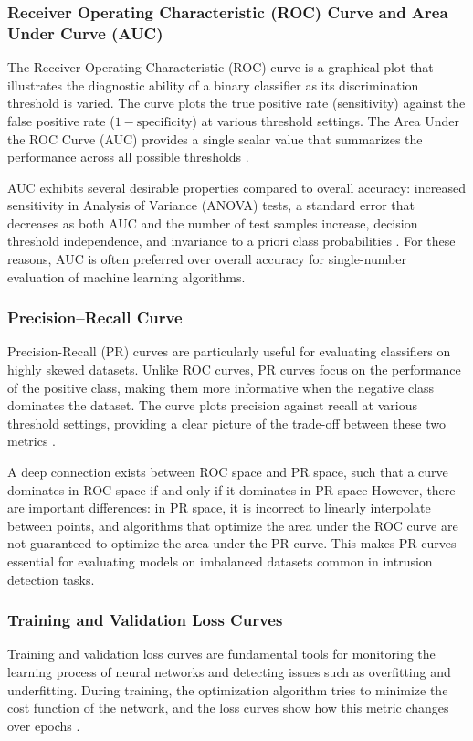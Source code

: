\documentclass[12pt, a4paper]{report}
\begin{document}
\subsubsection{Receiver Operating Characteristic (ROC) Curve and Area Under Curve (AUC)}
The Receiver Operating Characteristic (ROC) curve is a graphical plot that illustrates the diagnostic ability of a binary classifier as its discrimination threshold is varied. The curve plots the true positive rate (sensitivity) against the false positive rate ($1 - \text{specificity}$) at various threshold settings. The Area Under the ROC Curve (AUC) provides a single scalar value that summarizes the performance across all possible thresholds .

AUC exhibits several desirable properties compared to overall accuracy: increased sensitivity in Analysis of Variance (ANOVA) tests, a standard error that decreases as both AUC and the number of test samples increase, decision threshold independence, and invariance to a priori class probabilities . For these reasons, AUC is often preferred over overall accuracy for single-number evaluation of machine learning algorithms.

\subsubsection{Precision--Recall Curve}
Precision-Recall (PR) curves are particularly useful for evaluating classifiers on highly skewed datasets. Unlike ROC curves, PR curves focus on the performance of the positive class, making them more informative when the negative class dominates the dataset. The curve plots precision against recall at various threshold settings, providing a clear picture of the trade-off between these two metrics .

A deep connection exists between ROC space and PR space, such that a curve dominates in ROC space if and only if it dominates in PR space  However, there are important differences: in PR space, it is incorrect to linearly interpolate between points, and algorithms that optimize the area under the ROC curve are not guaranteed to optimize the area under the PR curve. This makes PR curves essential for evaluating models on imbalanced datasets common in intrusion detection tasks.

\subsubsection{Training and Validation Loss Curves}
Training and validation loss curves are fundamental tools for monitoring the learning process of neural networks and detecting issues such as overfitting and underfitting. During training, the optimization algorithm tries to minimize the cost function of the network, and the loss curves show how this metric changes over epochs .
\end{document}
